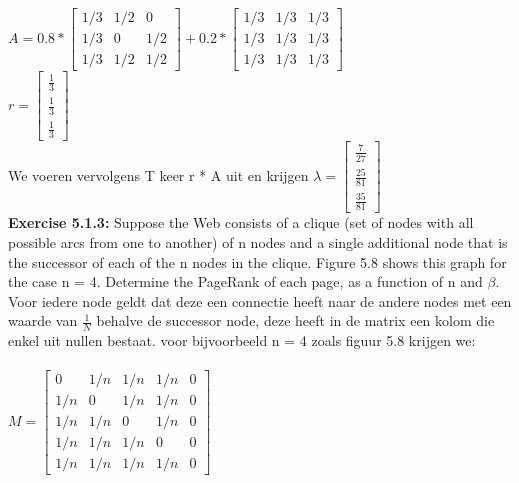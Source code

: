 \documentclass{exam}
\begin{document}
\begin{questions}
$A = 0.8 *  \begin{bmatrix}1/3 & 1/2 & 0\\ 
 1/3 & 0 & 1/2 \\ 
 1/3 & 1/2 & 1/2 \end{bmatrix} + 0.2 *  \begin{bmatrix}1/3 & 1/3 & 1/3\\ 
1/3 & 1/3 & 1/3\\ 
1/3 & 1/3 & 1/3 \end{bmatrix}$\\

$ r = \begin{bmatrix}
       \frac{1}{3} \\
       \frac{1}{3}\\
       \frac{1}{3}      
     \end{bmatrix}$\\
We voeren vervolgens T keer r * A uit en krijgen  $\lambda = \begin{bmatrix}
       \frac{7}{27} \\ \frac{25}{81} \\   \frac{35}{81}
     \end{bmatrix}$\\

\question \textbf{Exercise 5.1.3:} Suppose the Web consists of a clique (set of nodes with all possible arcs from one to another) of n nodes and a single additional node that is the successor of each of the n nodes in the clique. Figure 5.8 shows this graph for the case n = 4. Determine the PageRank of each page, as a function of n and $\beta$.     \\
     
Voor iedere node geldt dat deze een connectie heeft naar de andere nodes met een waarde van $\frac{1}{N}$ behalve de successor node, deze heeft in de matrix een kolom die enkel uit nullen bestaat.
voor bijvoorbeeld n = 4 zoals figuur 5.8 krijgen we:\\\\
$ M = \begin{bmatrix}0 & 1/n & 1/n & 1/n & 0\\ 
1/n & 0 & 1/n & 1/n & 0\\ 
1/n & 1/n & 0 & 1/n & 0\\ 
1/n & 1/n & 1/n & 0& 0\\ 
1/n & 1/n & 1/n & 1/n & 0 \end{bmatrix}$\\


\end{questions}
\end{document}
